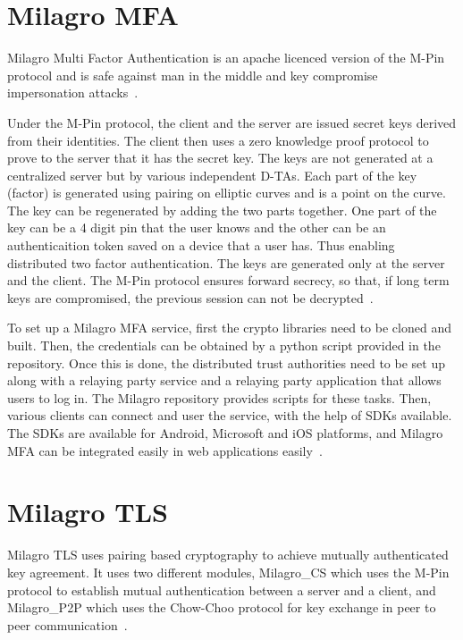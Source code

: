\section{Milagro MFA}

Milagro Multi Factor Authentication is an apache licenced version of
the M-Pin protocol and is safe against man in the middle and key
compromise impersonation attacks~\cite{milagro-mfa}.

Under the M-Pin protocol, the client and the server are issued secret
keys derived from their identities. The client then uses a zero
knowledge proof protocol to prove to the server that it has the secret
key. The keys are not generated at a centralized server but by various
independent D-TAs. Each part of the key (factor) is generated using
pairing on elliptic curves and is a point on the curve. The key can
be regenerated by adding the two parts together. One part of the key
can be a 4 digit pin that the user knows and the other can be an
authenticaition token saved on a device that a user has. Thus enabling
distributed two factor authentication. The keys are generated only at
the server and the client. The M-Pin protocol ensures forward secrecy,
so that, if long term keys are compromised, the previous session can
not be decrypted~\cite{milagro-protocols}.


To set up a Milagro MFA service, first the crypto libraries need to be
cloned and built. Then, the credentials can be obtained by a python
script provided in the repository.  Once this is done, the distributed
trust authorities need to be set up along with a relaying party
service and a relaying party application that allows users to log
in. The Milagro repository provides scripts for these tasks. Then,
various clients can connect and user the service, with the help of
SDKs available. The SDKs are available for Android, Microsoft and iOS
platforms, and Milagro MFA can be integrated easily in web
applications easily~\cite{mfa-install}.


\section{Milagro TLS}

Milagro TLS uses pairing based cryptography to achieve mutually
authenticated key agreement. It uses two different modules,
Milagro\_CS which uses the M-Pin protocol to establish mutual
authentication between a server and a client, and Milagro\_P2P which
uses the Chow-Choo protocol for key exchange in peer to peer
communication~\cite{mtls-white-paper}.


